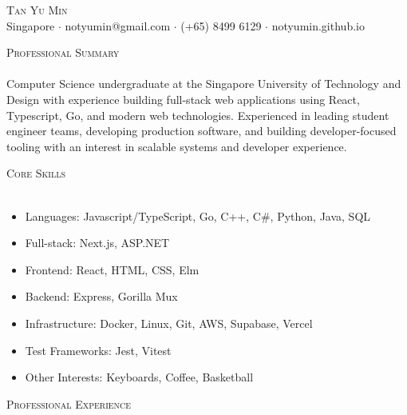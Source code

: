 \documentclass[a4paper]{article}
\newcommand{\lineunder} {
    \vspace*{-8pt} \\
    \hspace*{-18pt} \hrulefill \\
}
\newcommand{\header} [1] {
    {\hspace*{-18pt}\vspace*{6pt} \textsc{#1}}
    \vspace*{-6pt} \lineunder
}
\begin{document}
\vspace*{-40pt}



\vspace*{-10pt}
\begin{center}
	{\Huge \scshape {Tan Yu Min}}\\
	Singapore $\cdot$ notyumin@gmail.com $\cdot$ (+65) 8499 6129 $\cdot$ notyumin.github.io\\
\end{center}

\header{Professional Summary}
\vspace{2mm}
Computer Science undergraduate at the Singapore University of Technology and Design with experience building full-stack web applications using React, Typescript, Go, and modern web technologies. 
Experienced in leading student engineer teams, developing production software, and building developer-focused tooling with an interest in scalable systems and developer experience.
\vspace{4mm}

\header{Core Skills}
\vspace{-1mm}
\begin{itemize} \itemsep 0pt
    \item Languages: Javascript/TypeScript, Go, C++, C\#, Python, Java, SQL
    \item Full-stack: Next.js, ASP.NET
    \item Frontend: React, HTML, CSS, Elm
    \item Backend: Express, Gorilla Mux
    \item Infrastructure: Docker, Linux, Git, AWS, Supabase, Vercel
    \item Test Frameworks: Jest, Vitest
    \item Other Interests: Keyboards, Coffee, Basketball
\end{itemize}
\vspace{2mm}

\header{Professional Experience}
\vspace{1mm}
\end{document}
